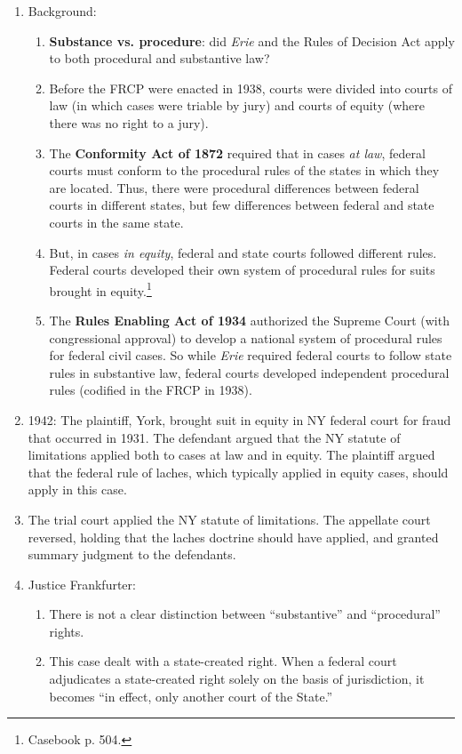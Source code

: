 \begin{enumerate}
    \item Background:
    \begin{enumerate}
        \item \textbf{Substance vs. procedure}: did \emph{Erie} and the Rules of Decision Act apply to both procedural and substantive law?
        \item Before the FRCP were enacted in 1938, courts were divided into courts of law (in which cases were triable by jury) and courts of equity (where there was no right to a jury).
        \item The \textbf{Conformity Act of 1872} required that in cases \emph{at law}, federal courts must conform to the procedural rules of the states in which they are located. Thus, there were procedural differences between federal courts in different states, but few differences between federal and state courts in the same state.
        \item But, in cases \emph{in equity}, federal and state courts followed different rules. Federal courts developed their own system of procedural rules for suits brought in equity.\footnote{Casebook p. 504.}
        \item The \textbf{Rules Enabling Act of 1934} authorized the Supreme Court (with congressional approval) to develop a national system of procedural rules for federal civil cases. So while \emph{Erie} required federal courts to follow state rules in substantive law, federal courts developed independent procedural rules (codified in the FRCP in 1938).
    \end{enumerate}
    \item 1942: The plaintiff, York, brought suit in equity in NY federal court for fraud that occurred in 1931. The defendant argued that the NY statute of limitations applied both to cases at law and in equity. The plaintiff argued that the federal rule of laches, which typically applied in equity cases, should apply in this case.
    \item The trial court applied the NY statute of limitations. The appellate court reversed, holding that the laches doctrine should have applied, and granted summary judgment to the defendants.
    \item Justice Frankfurter:
    \begin{enumerate}
        \item There is not a clear distinction between ``substantive'' and ``procedural'' rights.
        \item This case dealt with a state-created right. When a federal court adjudicates a state-created right solely on the basis of jurisdiction, it becomes ``in effect, only another court of the State.''

\end{enumerate}
\end{enumerate}

